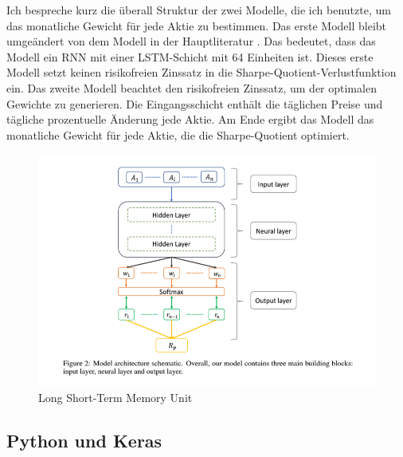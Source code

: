 \documentclass[12pt]{article}
\begin{document}
            Ich bespreche kurz die überall Struktur der zwei Modelle, die ich benutzte, 
            um das monatliche Gewicht für jede Aktie zu bestimmen. 
            Das erste Modell bleibt umgeändert von dem Modell in der Hauptliteratur \cite{zhang2020}. 
            Das bedeutet, dass das Modell ein RNN mit einer LSTM-Schicht mit 64 Einheiten ist. 
            Dieses erste Modell setzt keinen risikofreien Zinssatz in die Sharpe-Quotient-Verlustfunktion ein. 
            Das zweite Modell beachtet den risikofreien Zinssatz, um der optimalen Gewichte zu generieren. 
            Die Eingangsschicht enthält die täglichen Preise und tägliche prozentuelle Änderung jede Aktie. 
            Am Ende ergibt das Modell das monatliche Gewicht für jede Aktie, die die Sharpe-Quotient optimiert.

            \begin{figure}[ht]
            
                \begin{center}

                    \includegraphics[scale=1]{zhang-knn.png}
                    \caption{Long Short-Term Memory Unit \cite{zhang2020}}
        
                \end{center}
                
            \end{figure}


        \subsection{Python und Keras}
                
\end{document}
